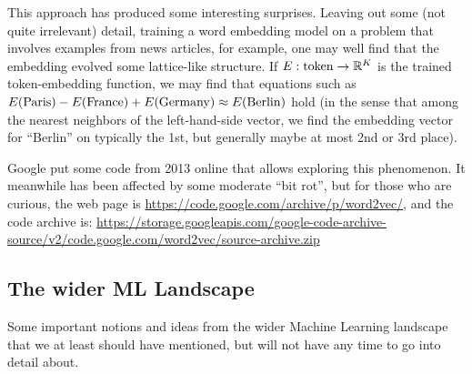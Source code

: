 \documentclass[11pt]{article}
\begin{document}
This approach has produced some interesting surprises. Leaving out some
(not quite irrelevant) detail, training a word embedding model on a
problem that involves examples from news articles, for example, one may
well find that the embedding evolved some lattice-like structure. If
\(E: {\rm token}\to{\mathbb R}^K\) is the trained token-embedding
function, we may find that equations such as
\(E({\rm Paris}) - E({\rm France}) + E({\rm Germany}) \approx E({\rm Berlin})\)
hold (in the sense that among the nearest neighbors of the
left-hand-side vector, we find the embedding vector for ``Berlin'' on
typically the 1st, but generally maybe at most 2nd or 3rd place).

Google put some code from 2013 online that allows exploring this
phenomenon. It meanwhile has been affected by some moderate ``bit rot'',
but for those who are curious, the web page is
\url{https://code.google.com/archive/p/word2vec/}, and the code archive
is:
\url{https://storage.googleapis.com/google-code-archive-source/v2/code.google.com/word2vec/source-archive.zip}

\hypertarget{the-wider-ml-landscape}{%
\subsection{The wider ML Landscape}\label{the-wider-ml-landscape}}

Some important notions and ideas from the wider Machine Learning
landscape that we at least should have mentioned, but will not have any
time to go into detail about.
\end{document}
